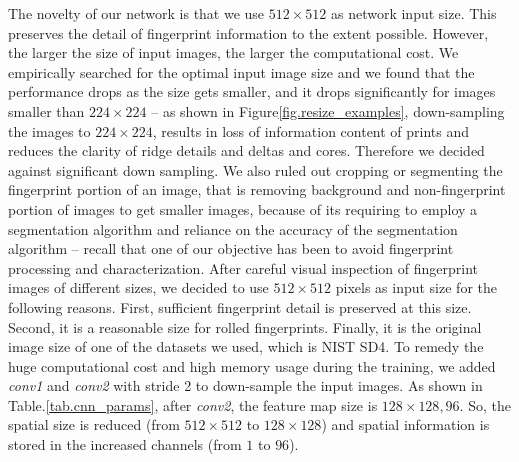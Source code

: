 The novelty of our network is that we use $512\times512$ as network input size. This preserves the detail of fingerprint information to the extent possible. 
%
However, the larger the size of input images, the larger the computational cost.  We empirically searched for the optimal input image size and we found that the performance drops as the size gets smaller, and it drops significantly for images smaller than $224\times224$ -- as shown in Figure\ref{fig.resize_examples}, down-sampling the images to $224\times224$, results in loss of information content of prints and reduces the clarity of ridge details and deltas and cores. 
%
Therefore we decided against significant down sampling.  
%
We also ruled out cropping or segmenting the fingerprint portion of an image, that is removing background and non-fingerprint portion of images to get smaller images, because of its requiring to employ a segmentation algorithm and reliance on the accuracy of the segmentation algorithm -- recall that one of our objective has been to avoid fingerprint processing and characterization.
%
After careful visual inspection of fingerprint images of different sizes, we decided to use $512\times512$ pixels as input size for the following reasons. 
%
First, sufficient fingerprint detail is preserved at this size. Second, it is a reasonable size for rolled fingerprints. Finally, it is the original image size of one of the datasets we used, which is NIST SD4.
%
To remedy the huge computational cost and high memory usage during the training, we added \textit{conv1} and \textit{conv2} with stride 2 to down-sample the input images. As shown in Table.\ref{tab.cnn_params}, after \textit{conv2}, the feature map size is $128\times128, 96$. So, the spatial size is reduced (from $512 \times 512$ to $128 \times 128$) and spatial information is stored in the increased channels (from $1$ to $96$).

